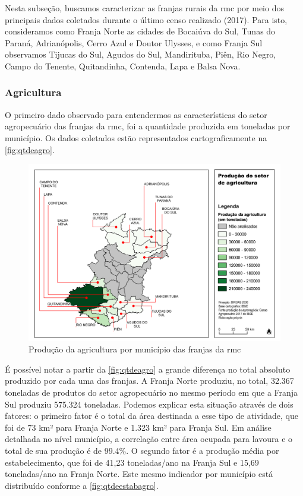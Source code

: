 	Nesta subseção, buscamos caracterizar as franjas rurais da \gls{rmc} por meio dos principais dados coletados durante o último censo realizado (2017). Para isto, consideramos como Franja Norte as cidades de Bocaiúva do Sul, Tunas do Paraná, Adrianópolis, Cerro Azul e Doutor Ulysses, e como Franja Sul observamos Tijucas do Sul, Agudos do Sul, Mandirituba, Piên, Rio Negro, Campo do Tenente, Quitandinha, Contenda, Lapa e Balsa Nova.
	
	\subsubsection{Agricultura}\label{sec:agricultura}
	
	O primeiro dado observado para entendermos as características do setor agropecuário das franjas da \glsdesc{rmc}, foi a quantidade produzida em toneladas por município. Os dados coletados estão representados cartograficamente na \autoref{fig:qtdeagro}.
	
	\begin{landscape}
		\begin{figure}
			\centering
			\caption{Produção da agricultura por município das franjas da \gls{rmc}}
			\label{fig:qtdeagro}
			\includegraphics[width=0.85\linewidth]{../gis/produtos/RMC_censorural_QTDE_PRODUZIDA_AGRO}
		\end{figure}
	\end{landscape}
	
	É possível notar a partir da \autoref{fig:qtdeagro} a grande diferença no total absoluto produzido por cada uma das franjas. A Franja Norte produziu, no total, 32.367 toneladas de produtos do setor agropecuário no mesmo período em que a Franja Sul produziu 575.324 toneladas. Podemos explicar esta situação através de dois fatores: o primeiro fator é o total da área destinada a esse tipo de atividade, que foi de 73 km² para Franja Norte e 1.323 km² para Franja Sul. Em análise detalhada no nível município, a correlação entre área ocupada para lavoura e o total de sua produção é de 99.4\%. O segundo fator é a produção média por estabelecimento, que foi de 41,23 toneladas/ano na Franja Sul e 15,69 toneladas/ano na Franja Norte. Este mesmo indicador por município está distribuído conforme a \autoref{fig:qtdeestabagro}.
	

